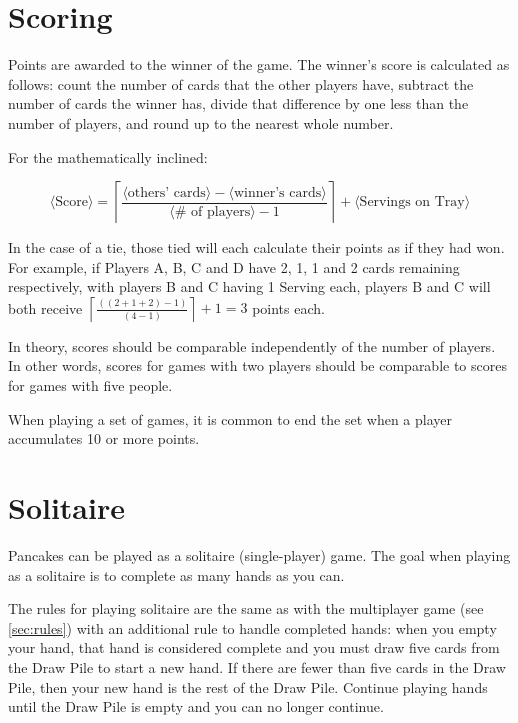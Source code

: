 \documentclass{article}
\begin{document}
\pagebreak
\section{Scoring \label{sec:scoring}}

Points are awarded to the winner of the game. The winner's score is calculated as follows: count the number of cards that the other players have, subtract the number of cards the winner has, divide that difference by one less than the number of players, and round up to the nearest whole number.

For the mathematically inclined:

$$
\langle\textrm{Score}\rangle = \left\lceil\frac{\langle\textrm{others'\ cards}\rangle - \langle\textrm{winner's\ cards}\rangle}{\langle\textrm{\#\ of\ players}\rangle - 1}\right\rceil + \langle\textrm{Servings on Tray}\rangle
$$

In the case of a tie, those tied will each calculate their points as if they had won. For example, if Players A, B, C and D have 2, 1, 1 and 2 cards remaining respectively, with players B and C having 1 Serving each, players B and C will both receive $\left\lceil\frac{\left((2+1+2) - 1\right)}{\left(4 - 1\right)}\right\rceil + 1 = 3$ points each.

In theory, scores should be comparable independently of the number of players. In other words, scores for games with two players should be comparable to scores for games with five people.

When playing a set of games, it is common to end the set when a player accumulates 10 or more points.

\pagebreak
\section{Solitaire \label{sec:solitaire}}

Pancakes can be played as a solitaire (single-player) game. The goal when playing as a solitaire is to complete as many hands as you can.

The rules for playing solitaire are the same as with the multiplayer game (see \autoref{sec:rules}) with an additional rule to handle completed hands: when you empty your hand, that hand is considered complete and you must draw five cards from the Draw Pile to start a new hand. If there are fewer than five cards in the Draw Pile, then your new hand is the rest of the Draw Pile. Continue playing hands until the Draw Pile is empty and you can no longer continue.
\end{document}

